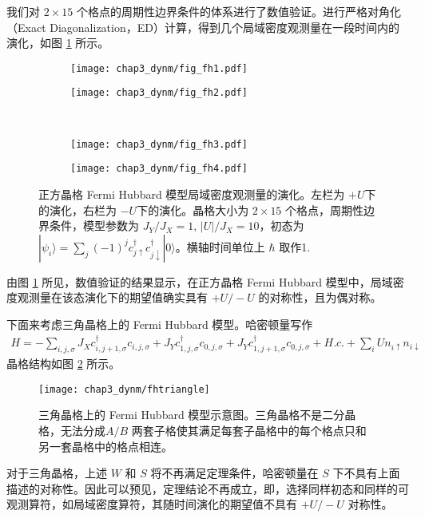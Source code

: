 我们对 $2\times15$ 个格点的周期性边界条件的体系进行了数值验证。进行严格对角化（Exact Diagonalization，ED）计算，得到几个局域密度观测量在一段时间内的演化，如图 \ref{fig:dynm:fhsed} 所示。
\begin{figure}[!htb]
\begin{subfigure}{.5\textwidth}
\texttt{[image: chap3\_dynm/fig\_fh1.pdf]}
\end{subfigure}
\begin{subfigure}{.5\textwidth}
\texttt{[image: chap3\_dynm/fig\_fh2.pdf]}
\end{subfigure}\\
\begin{subfigure}{.5\textwidth}
\texttt{[image: chap3\_dynm/fig\_fh3.pdf]}
\end{subfigure}
\begin{subfigure}{.5\textwidth}
\texttt{[image: chap3\_dynm/fig\_fh4.pdf]}
\end{subfigure}
\caption{正方晶格 Fermi Hubbard 模型局域密度观测量的演化。左栏为 $+U$下的演化，右栏为 $-U$下的演化。晶格大小为 $2\times15$ 个格点，周期性边界条件，模型参数为 $J_Y/J_X=1$, $|U|/J_X=10$，初态为 $|\psi_i\rangle=\sum_j (-1)^jc_{j\uparrow}^{\dagger}c_{j\downarrow}^{\dagger}|0\rangle$。横轴时间单位上 $\hbar$ 取作1.}
\label{fig:dynm:fhsed}
\end{figure}

由图 \ref{fig:dynm:fhsed} 所见，数值验证的结果显示，在正方晶格 Fermi Hubbard 模型中，局域密度观测量在该态演化下的期望值确实具有 $+U/-U$ 的对称性，且为偶对称。



下面来考虑三角晶格上的 Fermi Hubbard 模型。哈密顿量写作
\begin{align}
    H=-\sum_{i,j,\sigma}J_Xc_{i,j+1,\sigma}^{\dagger}c_{i,j,\sigma}+J_Yc_{1,j,\sigma}^{\dagger}c_{0,j,\sigma}+J_Yc_{1,j+1,\sigma}^{\dagger}c_{0,j,\sigma}+H.c.+\sum_iUn_{i\uparrow}n_{i\downarrow}
\end{align} 
晶格结构如图 \ref{fig:dynm:fhtriangle} 所示。
\begin{figure}[!htb]
\centering
\texttt{[image: chap3\_dynm/fhtriangle]}
\caption{三角晶格上的 Fermi Hubbard 模型示意图。三角晶格不是二分晶格，无法分成$A/B$ 两套子格使其满足每套子晶格中的每个格点只和另一套晶格中的格点相连。}
\label{fig:dynm:fhtriangle}
\end{figure}

对于三角晶格，上述 $W$ 和 $S$ 将不再满足定理条件，哈密顿量在 $S$ 下不具有上面描述的对称性。因此可以预见，定理结论不再成立，即，选择同样初态和同样的可观测算符，如局域密度算符，其随时间演化的期望值不具有 $+U/-U$ 对称性。

